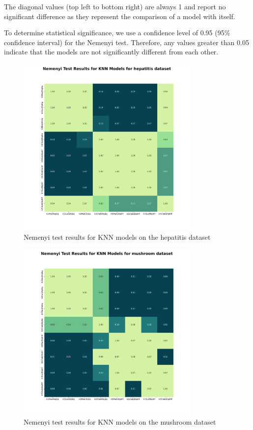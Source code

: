 The diagonal values (top left to bottom right) are always 1 and report no significant difference
as they represent the comparison of a model with itself.

To determine statistical significance, we use a confidence level of 0.95 (95\% confidence interval) for the Nemenyi test.
Therefore, any values greater than 0.05 indicate that the models are not significantly different from each other.

\begin{figure}[!ht]
    \centering
    \includegraphics[width=0.8\textwidth]{figures/nemenyi_test_results_KNN_hepatitis.png}
    \caption{Nemenyi test results for KNN models on the hepatitis dataset}
\label{fig:nemenyi_test_results_KNN_hepatitis}
\end{figure}

\begin{figure}[!ht]
    \centering
    \includegraphics[width=0.8\textwidth]{figures/nemenyi_test_results_KNN_mushroom.png}
    \caption{Nemenyi test results for KNN models on the mushroom dataset}
\label{fig:nemenyi_test_results_KNN_mushroom}
\end{figure}

